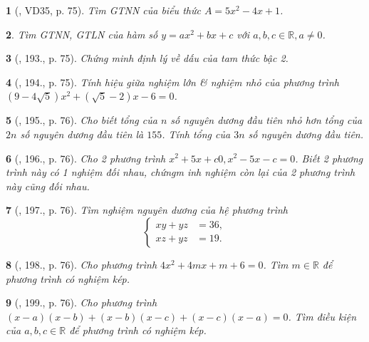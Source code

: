 \documentclass{article}
\newtheorem{baitoan}{}
\begin{document}
\begin{baitoan}[\cite{Tuyen_Toan_9_old}, VD35, p. 75]
	Tìm {\rm GTNN} của biểu thức $A = 5x^2 - 4x + 1$.
\end{baitoan}

\begin{baitoan}
	Tìm {\rm GTNN, GTLN} của hàm số $y = ax^2 + bx + c$ với $a,b,c\in\mathbb{R},a\ne0$.
\end{baitoan}

\begin{baitoan}[\cite{Tuyen_Toan_9_old}, 193., p. 75]
	Chứng minh định lý về dấu của tam thức bậc 2.
\end{baitoan}

\begin{baitoan}[\cite{Tuyen_Toan_9_old}, 194., p. 75]
	Tính hiệu giữa nghiệm lớn \& nghiệm nhỏ của phương trình $(9 - 4\sqrt{5})x^2 + (\sqrt{5} - 2)x - 6 = 0$.
\end{baitoan}

\begin{baitoan}[\cite{Tuyen_Toan_9_old}, 195., p. 76]
	Cho biết tổng của $n$ số nguyên dương đầu tiên nhỏ hơn tổng của $2n$ số nguyên dương đầu tiên là $155$. Tính tổng của $3n$ số nguyên dương đầu tiên.
\end{baitoan}

\begin{baitoan}[\cite{Tuyen_Toan_9_old}, 196., p. 76]
	Cho 2 phương trình $x^2 + 5x + c 0,x^2 - 5x - c = 0$. Biết 2 phương trình này có 1 nghiệm đối nhau, chứngm inh nghiệm còn lại của 2 phương trình này cũng đối nhau.
\end{baitoan}

\begin{baitoan}[\cite{Tuyen_Toan_9_old}, 197., p. 76]
	Tìm nghiệm nguyên dương của hệ phương trình
	\begin{equation*}
		\left\{\begin{split}
			xy + yz &= 36,\\
			xz + yz &= 19.
		\end{split}\right.
	\end{equation*}
\end{baitoan}

\begin{baitoan}[\cite{Tuyen_Toan_9_old}, 198., p. 76]
	Cho phương trình $4x^2 + 4mx + m + 6 = 0$. Tìm $m\in\mathbb{R}$ để phương trình có nghiệm kép.
\end{baitoan}

\begin{baitoan}[\cite{Tuyen_Toan_9_old}, 199., p. 76]
	Cho phương trình $(x - a)(x - b) + (x - b)(x - c) + (x - c)(x - a) = 0$. Tìm điều kiện của $a,b,c\in\mathbb{R}$ để phương trình có nghiệm kép.
\end{baitoan}
\end{document}
